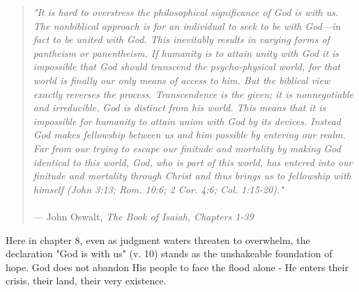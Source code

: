 \documentclass[11pt]{article}
\begin{document}
\begin{quote}
\textit{"It is hard to overstress the philosophical significance of God is with us. The nonbiblical approach is for an individual to seek to be with God—in fact to be united with God. This inevitably results in varying forms of pantheism or panentheism. If humanity is to attain unity with God it is impossible that God should transcend the psycho-physical world, for that world is finally our only means of access to him. But the biblical view exactly reverses the process. Transcendence is the given; it is nonnegotiable and irreducible. God is distinct from his world. This means that it is impossible for humanity to attain union with God by its devices. Instead God makes fellowship between us and him possible by entering our realm. Far from our trying to escape our finitude and mortality by making God identical to this world, God, who is part of this world, has entered into our finitude and mortality through Christ and thus brings us to fellowship with himself (John 3:13; Rom. 10:6; 2 Cor. 4:6; Col. 1:15-20)."}\\\\
\hfill --- John Oswalt, \textit{The Book of Isaiah, Chapters 1-39}
\end{quote}

\vspace{1em}
Here in chapter 8, even as judgment waters threaten to overwhelm, the declaration "God is with us" (v. 10) stands as the unshakeable foundation of hope. God does not abandon His people to face the flood alone - He enters their crisis, their land, their very existence.
\end{document}
